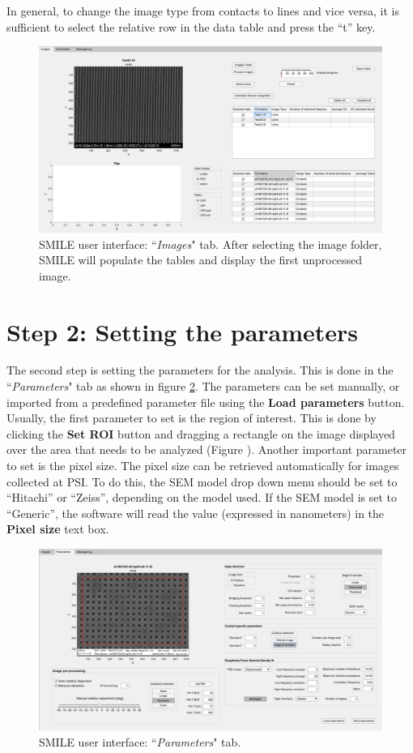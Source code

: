 \documentclass[12pt, a4paper, openany]{report}
\begin{document}
In general, to change the image type from contacts to lines and vice versa, it is sufficient to select the relative row in the data table and press the ``t'' key.
\begin{figure}[hbtp]
	\includegraphics[width=\textwidth]{figures/GUI_01A.png}
	\caption{SMILE user interface: ``\emph{Images}" tab. After selecting the image folder, SMILE will populate the tables and display the first unprocessed image.}
	\label{fig:GUI_01A}
\end{figure}
\section{Step 2: Setting the parameters}
The second step is setting the parameters for the analysis. This is done in the ``\emph{Parameters}" tab as shown in figure \ref{fig:GUI_02A}. The parameters can be set manually, or imported from a predefined parameter file using the \textbf{Load parameters} button. Usually, the first parameter to set is the region of interest. This is done by clicking the \textbf{Set ROI} button and dragging a rectangle on the image displayed over the area that needs to be analyzed (Figure \label{fig:GUI_02A}). Another important parameter to set is the pixel size. The pixel size can be retrieved automatically for images collected at PSI. To do this, the SEM model drop down menu should be set to ``Hitachi'' or ``Zeiss'', depending on the model used. If the SEM model is set to ``Generic'', the software will read the value (expressed in  nanometers) in the \textbf{Pixel size} text box.
\begin{figure}[thbp]
	\includegraphics[width=\textwidth]{figures/GUI_02A.png}
	\caption{SMILE user interface: ``\emph{Parameters}" tab.}
	\label{fig:GUI_02A}
\end{figure}
\end{document}
